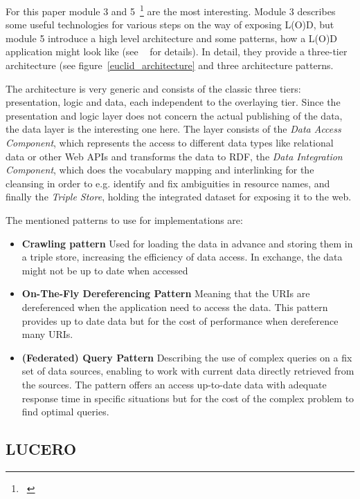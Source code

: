For this paper module 3 and 5~\footnote{~\cite{euclid:chap5}} are the most interesting. Module 3 describes some useful technologies for various steps on the way of exposing L(O)D, but module 5 introduce a high level architecture and some patterns, how a L(O)D application might look like (see ~\cite{euclid:chap5} for details). In detail, they provide a three-tier architecture (see figure~\ref{euclid_architecture} and three architecture patterns.

The architecture is very generic and consists of the classic three tiers: presentation, logic and data, each independent to the overlaying tier. Since the presentation and logic layer does not concern the actual publishing of the data, the data layer is the interesting one here. The layer consists of the \emph{Data Access Component}, which represents the access to different data types like relational data or other Web APIs and transforms the data to RDF, the \emph{Data Integration Component}, which does the vocabulary mapping and interlinking for the cleansing in order to e.g. identify and fix ambiguities in resource names, and finally the \emph{Triple Store}, holding the integrated dataset for exposing it to the web.

The mentioned patterns to use for implementations are:

\begin{itemize}
\item \textbf{Crawling pattern}
Used for loading the data in advance and storing them in a triple store, increasing the efficiency of data access. In exchange, the data might not be up to date when accessed
\item \textbf{On-The-Fly Dereferencing Pattern}
Meaning that the URIs are dereferenced when the application need to access the data. This pattern provides up to date data but for the cost of performance when dereference many URIs.
\item \textbf{(Federated) Query Pattern}
Describing the use of complex queries on a fix set of data sources, enabling to work with current data directly retrieved from the sources. The pattern offers an access up-to-date data with adequate response time in specific situations but for the cost of the complex problem to find optimal queries.
\end{itemize}

\subsection{LUCERO}

